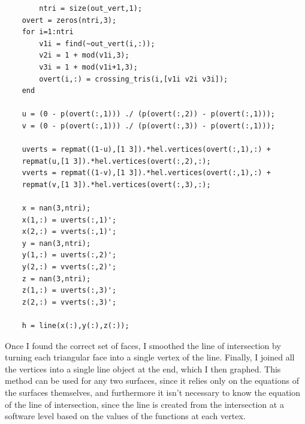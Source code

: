 \documentclass{article}
\begin{document}
	\begin{verbatim}
	    ntri = size(out_vert,1);
    overt = zeros(ntri,3);
    for i=1:ntri
        v1i = find(~out_vert(i,:));
        v2i = 1 + mod(v1i,3);
        v3i = 1 + mod(v1i+1,3);
        overt(i,:) = crossing_tris(i,[v1i v2i v3i]);
    end
    
    u = (0 - p(overt(:,1))) ./ (p(overt(:,2)) - p(overt(:,1)));
    v = (0 - p(overt(:,1))) ./ (p(overt(:,3)) - p(overt(:,1)));
    
    uverts = repmat((1-u),[1 3]).*hel.vertices(overt(:,1),:) + 
    repmat(u,[1 3]).*hel.vertices(overt(:,2),:);
    vverts = repmat((1-v),[1 3]).*hel.vertices(overt(:,1),:) + 
    repmat(v,[1 3]).*hel.vertices(overt(:,3),:);
    
    x = nan(3,ntri);
    x(1,:) = uverts(:,1)';
    x(2,:) = vverts(:,1)';
    y = nan(3,ntri);
    y(1,:) = uverts(:,2)';
    y(2,:) = vverts(:,2)';
    z = nan(3,ntri);
    z(1,:) = uverts(:,3)';
    z(2,:) = vverts(:,3)';
    
    h = line(x(:),y(:),z(:));
    \end{verbatim}
    
	Once I found the correct set of faces, I smoothed the line of intersection by turning each triangular face into a single vertex of the line. Finally, I joined all the vertices into a single line object at the end, which I then graphed. This method can be used for any two surfaces, since it relies only on the equations of the surfaces themselves, and furthermore it isn't necessary to know the equation of the line of intersection, since the line is created from the intersection at a software level based on the values of the functions at each vertex.
	

	
\end{document}
